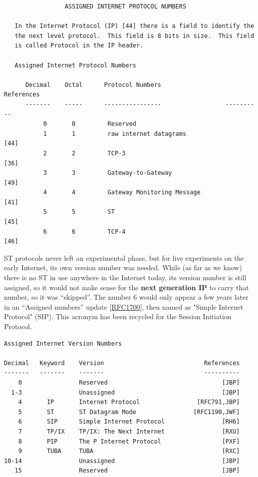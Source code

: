 \documentclass[
]{article}
\begin{document}
\begin{verbatim}
                 ASSIGNED INTERNET PROTOCOL NUMBERS

   In the Internet Protocol (IP) [44] there is a field to identify the
   the next level protocol.  This field is 8 bits in size.  This field
   is called Protocol in the IP header.

   Assigned Internet Protocol Numbers

      Decimal    Octal      Protocol Numbers                  References
      -------    -----      ----------------                  ----------
           0       0         Reserved
           1       1         raw internet datagrams                 [44]
           2       2         TCP-3                                  [36]
           3       3         Gateway-to-Gateway                     [49]
           4       4         Gateway Monitoring Message             [41]
           5       5         ST                                     [45]
           6       6         TCP-4                                  [46]
\end{verbatim}

ST protocols never left an experimental phase, but for live experiments
on the early Internet, its own version number was needed. While (as far
as we know) there is no ST in use anywhere in the Internet today, its
version number is still assigned, so it would not make sense for the
\textbf{next generation IP} to carry that number, so it was ``skipped''.
The number 6 would only appear a few years later in an ``Assigned
numbers'' update
{[}\href{https://www.rfc-editor.org/info/rfc1700}{RFC1700}{]}, then
named as "Simple Internet Protocol" (SIP). This acronym has been
recycled for the Session Initiation Protocol.

\begin{verbatim}
Assigned Internet Version Numbers

Decimal   Keyword    Version                            References
-------   -------    -------                            ----------
    0                Reserved                                [JBP]
  1-3                Unassigned                              [JBP]
    4       IP       Internet Protocol                [RFC791,JBP]
    5       ST       ST Datagram Mode                [RFC1190,JWF]
    6       SIP      Simple Internet Protocol                [RH6]
    7       TP/IX    TP/IX: The Next Internet                [RXU]
    8       PIP      The P Internet Protocol                 [PXF]
    9       TUBA     TUBA                                    [RXC]
10-14                Unassigned                              [JBP]
   15                Reserved                                [JBP]
\end{verbatim}
\end{document}

